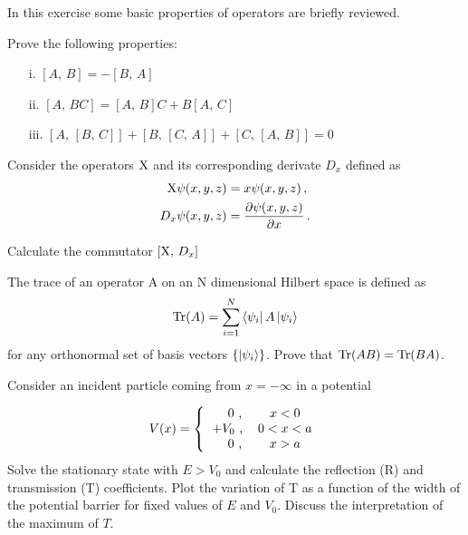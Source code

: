 
In this exercise some basic properties of operators are briefly reviewed. 

\begin{subtasks}
 \item Prove the following properties: 
 \begin{enumerate}
   \item[i.] $[A,\,B] = -[B,\,A]$
   \item[ii.] $[A,\,BC] = [A,\,B]C + B[A,\,C]$
   \item[iii.] $[A,\,[B,\,C]] + [B,\,[C,\,A]] + [C,\,[A,\,B]] = 0$ 
 \end{enumerate}
  \item Consider the operators $\rm{X}$ and its corresponding derivate $D_{x}$ defined as 
  \begin{equation}
   \begin{aligned}
    {\rm{X\psi}}(x,y,z) & = x\psi(x,y,z)\,, \nonumber \\ 
    D_{x}\psi(x,y,z) & =\frac{\partial \psi(x,y,z)}{\partial x}\,. \nonumber
   \end{aligned}
  \end{equation}
    
  Calculate the commutator $[{\rm{X}},\,D_{x}]$
%
 \item The trace of an operator A on an N dimensional Hilbert space is defined as 
  \begin{equation} 
    {\rm{Tr}}(A) = \sum^{N}_{i=1}\mathinner{\langle{\psi_{i}}|} A \mathinner{|{\psi_{i}}\rangle} \nonumber
  \end{equation}
  for any orthonormal set of basis vectors $\{\mathinner{|{\psi_{i}}\rangle}\}$.
  Prove that ${\rm{Tr}}(AB) = {\rm{Tr}}(BA)$.  
%
\end{subtasks}

  
  Consider an incident particle coming from $x = - \infty$ in a potential 

  \[ V(x) =  
  \left \{
  \begin{tabular}{cc}
    $~~~\,0$ , & $x < 0$     \\
    $+V_{0}$ , & $0 < x < a$ \\
    $~~~\,0$ , & $x > a$ \\ 
  \end{tabular}
  \right.
  \]
  Solve the stationary state with $E > V_{0}$ and calculate the reflection (R) and transmission (T) coefficients. 
  Plot the variation of T as a function of the width of the potential barrier for fixed values of $E$ and $V_{0}$. 
  Discuss the interpretation of the maximum of $T$.  


